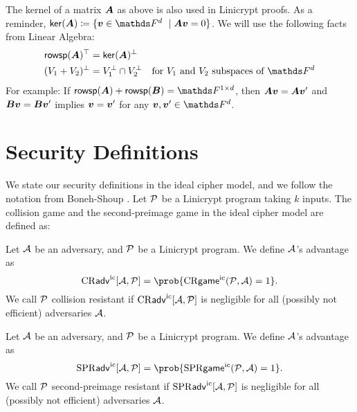 The kernel of a matrix $\v A$ as above is also used in Linicrypt proofs.
As a reminder, $\ker(\v A) \coloneqq \{ \vv \in \Fsp\ \mid \v A \vv = 0\}$.
We will use the following facts from Linear Algebra:
\begin{align*}
  \rowsp(\v A)^\top &= \ker(\v A)^\perp \\
  (V_1 + V_2)^\perp &= V_1^\perp \cap V_2^\perp \quad \textrm{for $V_1$ and $V_2$ subspaces of $\Fsp$}
\end{align*}
For example:
If $\rowsp(\v A) + \rowsp(\v B) = \Frowsp$,
then $\v A \vv = \v A \vv'$ and $\v B \vv = \v B \vv'$ implies $\vv = \vv'$ for any $\vv, \vv' \in \Fsp$.

\section{Security Definitions}
We state our security definitions in the ideal cipher model, and we
follow the notation from Boneh-Shoup \cite{Boneh2015CourseIA}.
Let $\P$ be a Linicrypt program taking $k$ inputs.
The collision game and the second-preimage game in the ideal cipher model are defined as:
\begin{pchstack}[center, space=0.4cm]
\end{pchstack}

\begin{defn}
\label{defn:collision_resistance_ic}
  Let $\A$ be an adversary, and $\P$ be a Linicrypt program.
  We define $\A$'s advantage as 
  \[
    \cradv{\A, \P} = \prob{\crgame(\P, \A) = 1}.
  \]
  We call $\P$ collision resistant if
  $\cradv{\A, \P}$ is negligible for all (possibly not efficient) adversaries $\A$.
\end{defn}

\begin{defn}
\label{defn:second_preimage_resistance_ic}
  Let $\A$ be an adversary, and $\P$ be a Linicrypt program.
  We define $\A$'s advantage as 
  \[
    \spradv{\A, \P} = \prob{\sprgame(\P, \A) = 1}.
  \]
  We call $\P$ second-preimage resistant
  if $\spradv{\A, \P}$ is negligible for all (possibly not efficient) adversaries $\A$.
\end{defn}

